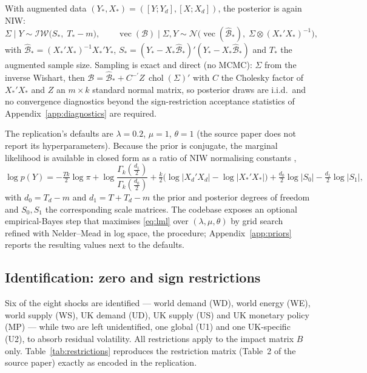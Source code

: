 With augmented data $(Y_*, X_*) = ([Y; Y_d], [X; X_d])$, the posterior is again NIW:
\begin{equation}
\Sigma \mid Y \sim \mathcal{IW}\!\big(S_*,\; T_* - m\big), \qquad
\operatorname{vec}(\mathcal{B}) \mid \Sigma, Y \sim \mathcal{N}\!\big(\operatorname{vec}(\hat{\mathcal{B}}_*),\; \Sigma \otimes (X_*'X_*)^{-1}\big),
\label{eq:posterior}
\end{equation}
with $\hat{\mathcal{B}}_* = (X_*'X_*)^{-1}X_*'Y_*$, $S_* = (Y_* - X_*\hat{\mathcal{B}}_*)'(Y_* - X_*\hat{\mathcal{B}}_*)$ and $T_*$ the augmented sample size. Sampling is exact and direct (no MCMC): $\Sigma$ from the inverse Wishart, then $\mathcal{B} = \hat{\mathcal{B}}_* + C^{-\prime} Z\, \operatorname{chol}(\Sigma)'$ with $C$ the Cholesky factor of $X_*'X_*$ and $Z$ an $m \times k$ standard normal matrix, so posterior draws are i.i.d.\ and no convergence diagnostics beyond the sign-restriction acceptance statistics of Appendix~\ref{app:diagnostics} are required.

The replication's defaults are $\lambda = 0.2$, $\mu = 1$, $\theta = 1$ (the source paper does not report its hyperparameters). Because the prior is conjugate, the marginal likelihood is available in closed form as a ratio of NIW normalising constants \citep[eq.~5]{giannone2015},
\begin{equation}
\log p(Y) = -\tfrac{Tk}{2}\log\pi
+ \log\frac{\Gamma_k(\tfrac{d_1}{2})}{\Gamma_k(\tfrac{d_0}{2})}
+ \tfrac{k}{2}\big(\log|X_d'X_d| - \log|X_*'X_*|\big)
+ \tfrac{d_0}{2}\log|S_0| - \tfrac{d_1}{2}\log|S_1|,
\label{eq:lml}
\end{equation}
with $d_0 = T_d - m$ and $d_1 = T + T_d - m$ the prior and posterior degrees of freedom and $S_0, S_1$ the corresponding scale matrices. The codebase exposes an optional empirical-Bayes step that maximises \eqref{eq:lml} over $(\lambda, \mu, \theta)$ by grid search refined with Nelder--Mead in log space, the \citet{giannone2015} procedure; Appendix~\ref{app:priors} reports the resulting values next to the defaults.

\subsection{Identification: zero and sign restrictions}

Six of the eight shocks are identified --- world demand (WD), world energy (WE), world supply (WS), UK demand (UD), UK supply (US) and UK monetary policy (MP) --- while two are left unidentified, one global (U1) and one UK-specific (U2), to absorb residual volatility. All restrictions apply to the impact matrix $B$ only. Table~\ref{tab:restrictions} reproduces the restriction matrix (Table~2 of the source paper) exactly as encoded in the replication.

